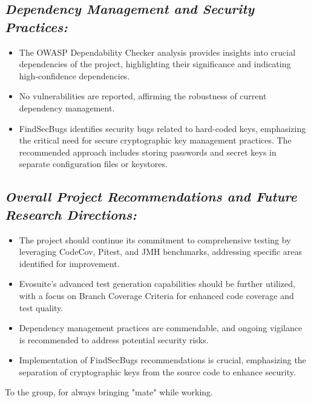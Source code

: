 \documentclass[sigconf]{acmart}
\begin{document}
\subsection{\textbf{\textit{Dependency Management and Security Practices:}}}
   \begin{itemize}
       \item The OWASP Dependability Checker analysis provides insights into crucial dependencies of the project, highlighting their significance and indicating high-confidence dependencies.
       \item No vulnerabilities are reported, affirming the robustness of current dependency management.
       \item FindSecBugs identifies security bugs related to hard-coded keys, emphasizing the critical need for secure cryptographic key management practices. The recommended approach includes storing passwords and secret keys in separate configuration files or keystores.
   \end{itemize}

\subsection{\textbf{\textit{Overall Project Recommendations and Future Research Directions:}}}
   \begin{itemize}
       \item The project should continue its commitment to comprehensive testing by leveraging CodeCov, Pitest, and JMH benchmarks, addressing specific areas identified for improvement.
       \item Evosuite's advanced test generation capabilities should be further utilized, with a focus on Branch Coverage Criteria for enhanced code coverage and test quality.
       \item Dependency management practices are commendable, and ongoing vigilance is recommended to address potential security risks.
       \item Implementation of FindSecBugs recommendations is crucial, emphasizing the separation of cryptographic keys from the source code to enhance security.
       
   \end{itemize}
\begin{acks}
To the group, for always bringing "mate" while working.
\end{acks}
\end{document}
